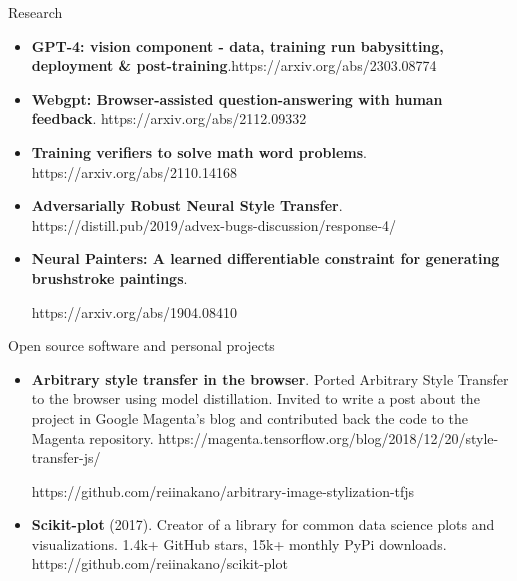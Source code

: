 \documentclass[]{mcdowellcv}
\begin{document}
	\begin{cvsection}{Research}
	   \begin{cvsubsection}{}{}{}
	      \begin{itemize}
    		  \item \textbf{GPT-4: vision component - data, training run babysitting, deployment \& post-training}.\newline https://arxiv.org/abs/2303.08774
       
    		  \item \textbf{Webgpt: Browser-assisted question-answering with human feedback}. https://arxiv.org/abs/2112.09332
        
    		  \item \textbf{Training verifiers to solve math word problems}. https://arxiv.org/abs/2110.14168
        
    		  \item \textbf{Adversarially Robust Neural Style Transfer}. https://distill.pub/2019/advex-bugs-discussion/response-4/
	          
	          \item \textbf{Neural Painters: A learned differentiable constraint for generating brushstroke paintings}.
	          
	          https://arxiv.org/abs/1904.08410
	      \end{itemize}
	   \end{cvsubsection}
	\end{cvsection}
	
	\begin{cvsection}{Open source software and personal projects}
		\begin{cvsubsection}{}{}{}
			\begin{itemize}
			
			    \item \textbf{Arbitrary style transfer in the browser}. Ported Arbitrary Style Transfer to the browser using model distillation. Invited to write a post about the project in Google Magenta's blog and contributed back the code to the Magenta repository. https://magenta.tensorflow.org/blog/2018/12/20/style-transfer-js/
			    
			    https://github.com/reiinakano/arbitrary-image-stylization-tfjs 
			    \item \textbf{Scikit-plot} (2017). Creator of a library for common data science plots and visualizations. 1.4k+ GitHub stars, 15k+ monthly PyPi downloads. https://github.com/reiinakano/scikit-plot
			\end{itemize}
		\end{cvsubsection}
	\end{cvsection}
	
\end{document}
